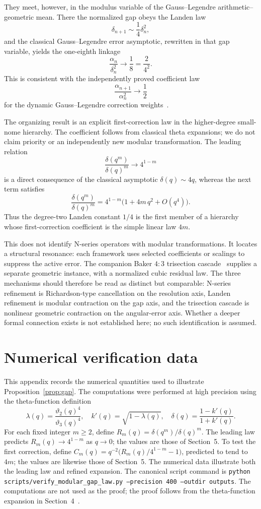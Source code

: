 \documentclass[11pt]{article}
\begin{document}
They meet, however, in the modulus variable of the Gauss--Legendre
arithmetic--geometric mean. There the normalized gap obeys the Landen law
\[
\delta_{n+1}\sim\frac14\delta_n^2,
\]
and the classical Gauss--Legendre error asymptotic, rewritten in that gap
variable, yields the one-eighth linkage
\[
\frac{\alpha_n}{\delta_n^2}\longrightarrow\frac18=\frac{2}{4^2}.
\]
This is consistent with the independently proved coefficient law
\[
\frac{\alpha_{n+1}}{\alpha_n^2}\longrightarrow\frac12
\]
for the dynamic Gauss--Legendre correction weights~\cite{BakerAGM2026}.

The organizing result is an explicit first-correction law in the higher-degree
small-nome hierarchy. The coefficient follows from classical theta expansions;
we do not claim priority or an independently new modular transformation. The leading relation
\[
\frac{\delta(q^m)}{\delta(q)^m}\longrightarrow4^{1-m}
\]
is a direct consequence of the classical asymptotic $\delta(q)\sim4q$, whereas
the next term satisfies
\[
\frac{\delta(q^m)}{\delta(q)^m}
=
4^{1-m}\bigl(1+4m\,q^2+O(q^4)\bigr).
\]
Thus the degree-two Landen constant $1/4$ is the first member of a hierarchy
whose first-correction coefficient is the simple linear law $4m$.

This does not identify N-series operators with modular transformations. It
locates a structural resonance: each framework uses selected coefficients or
scalings to suppress the active error. The companion Baker $4{:}3$ trisection
cascade~\cite{BakerCascade2026} supplies a separate geometric instance, with a
normalized cubic residual law. The three mechanisms should therefore be read as
distinct but comparable: N-series refinement is Richardson-type cancellation on
the resolution axis, Landen refinement is modular contraction on the gap axis,
and the trisection cascade is nonlinear geometric contraction on the
angular-error axis. Whether a deeper formal connection exists is not established here; no such
identification is assumed.

\appendix

\section{Numerical verification data}

This appendix records the numerical quantities used to illustrate
Proposition~\ref{prop:gap}. The computations were performed at high precision
using the theta-function definition
\[
\lambda(q)=\frac{\vartheta_2(q)^4}{\vartheta_3(q)^4},
\quad
k'(q)=\sqrt{1-\lambda(q)},
\quad
\delta(q)=\frac{1-k'(q)}{1+k'(q)}.
\]
For each fixed integer $m\ge 2$, define $R_m(q)=\delta(q^m)/\delta(q)^m$. The
leading law predicts $R_m(q)\to 4^{1-m}$ as $q\to 0$; the values are those of
Section~5. To test the first correction, define
$C_m(q)=q^{-2}\bigl(R_m(q)/4^{1-m}-1\bigr)$, predicted to tend to $4m$; the
values are likewise those of Section~5. The numerical data illustrate both the leading law and refined expansion.
The canonical script command is
\texttt{python scripts/verify\_modular\_gap\_law.py --precision 400 --outdir outputs}. The computations are not used as
the proof; the proof follows from the theta-function expansion in
Section~4~\cite{abramowitz1972}.
\end{document}
